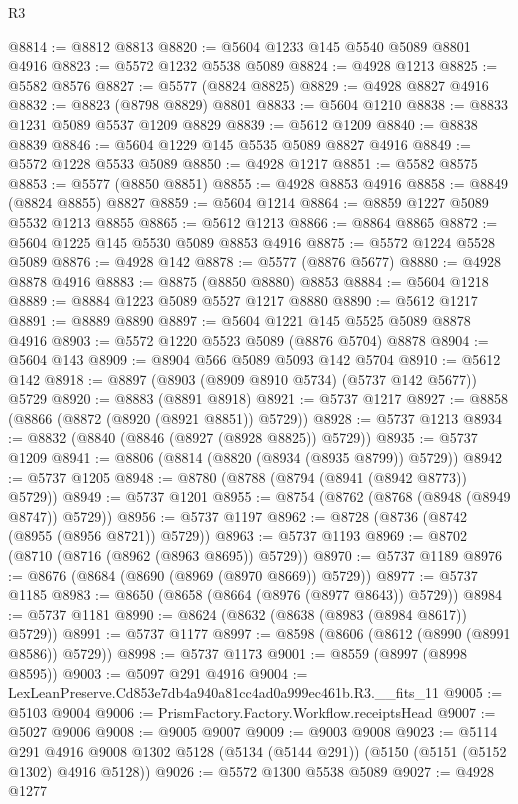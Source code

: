 \begin{lexlean}{R3}
\begin{coremodule}
@8814 := @8812 @8813
@8820 := @5604 @1233 @145 @5540 @5089 @8801 @4916
@8823 := @5572 @1232 @5538 @5089
@8824 := @4928 @1213
@8825 := @5582 @8576
@8827 := @5577 (@8824 @8825)
@8829 := @4928 @8827 @4916
@8832 := @8823 (@8798 @8829) @8801
@8833 := @5604 @1210
@8838 := @8833 @1231 @5089 @5537 @1209 @8829
@8839 := @5612 @1209
@8840 := @8838 @8839
@8846 := @5604 @1229 @145 @5535 @5089 @8827 @4916
@8849 := @5572 @1228 @5533 @5089
@8850 := @4928 @1217
@8851 := @5582 @8575
@8853 := @5577 (@8850 @8851)
@8855 := @4928 @8853 @4916
@8858 := @8849 (@8824 @8855) @8827
@8859 := @5604 @1214
@8864 := @8859 @1227 @5089 @5532 @1213 @8855
@8865 := @5612 @1213
@8866 := @8864 @8865
@8872 := @5604 @1225 @145 @5530 @5089 @8853 @4916
@8875 := @5572 @1224 @5528 @5089
@8876 := @4928 @142
@8878 := @5577 (@8876 @5677)
@8880 := @4928 @8878 @4916
@8883 := @8875 (@8850 @8880) @8853
@8884 := @5604 @1218
@8889 := @8884 @1223 @5089 @5527 @1217 @8880
@8890 := @5612 @1217
@8891 := @8889 @8890
@8897 := @5604 @1221 @145 @5525 @5089 @8878 @4916
@8903 := @5572 @1220 @5523 @5089 (@8876 @5704) @8878
@8904 := @5604 @143
@8909 := @8904 @566 @5089 @5093 @142 @5704
@8910 := @5612 @142
@8918 := @8897 (@8903 (@8909 @8910 @5734) (@5737 @142 @5677)) @5729
@8920 := @8883 (@8891 @8918)
@8921 := @5737 @1217
@8927 := @8858 (@8866 (@8872 (@8920 (@8921 @8851)) @5729))
@8928 := @5737 @1213
@8934 := @8832 (@8840 (@8846 (@8927 (@8928 @8825)) @5729))
@8935 := @5737 @1209
@8941 := @8806 (@8814 (@8820 (@8934 (@8935 @8799)) @5729))
@8942 := @5737 @1205
@8948 := @8780 (@8788 (@8794 (@8941 (@8942 @8773)) @5729))
@8949 := @5737 @1201
@8955 := @8754 (@8762 (@8768 (@8948 (@8949 @8747)) @5729))
@8956 := @5737 @1197
@8962 := @8728 (@8736 (@8742 (@8955 (@8956 @8721)) @5729))
@8963 := @5737 @1193
@8969 := @8702 (@8710 (@8716 (@8962 (@8963 @8695)) @5729))
@8970 := @5737 @1189
@8976 := @8676 (@8684 (@8690 (@8969 (@8970 @8669)) @5729))
@8977 := @5737 @1185
@8983 := @8650 (@8658 (@8664 (@8976 (@8977 @8643)) @5729))
@8984 := @5737 @1181
@8990 := @8624 (@8632 (@8638 (@8983 (@8984 @8617)) @5729))
@8991 := @5737 @1177
@8997 := @8598 (@8606 (@8612 (@8990 (@8991 @8586)) @5729))
@8998 := @5737 @1173
@9001 := @8559 (@8997 (@8998 @8595))
@9003 := @5097 @291 @4916
@9004 := LexLeanPreserve.Cd853e7db4a940a81cc4ad0a999ec461b.R3.__fits_11
@9005 := @5103 @9004
@9006 := PrismFactory.Factory.Workflow.receiptsHead
@9007 := @5027 @9006
@9008 := @9005 @9007
@9009 := @9003 @9008
@9023 := @5114
    @291
    @4916
    @9008
    @1302
    @5128
    (@5134 (@5144 @291))
    (@5150 (@5151 (@5152 @1302) @4916 @5128))
@9026 := @5572 @1300 @5538 @5089
@9027 := @4928 @1277

\end{coremodule}
\end{lexlean}
